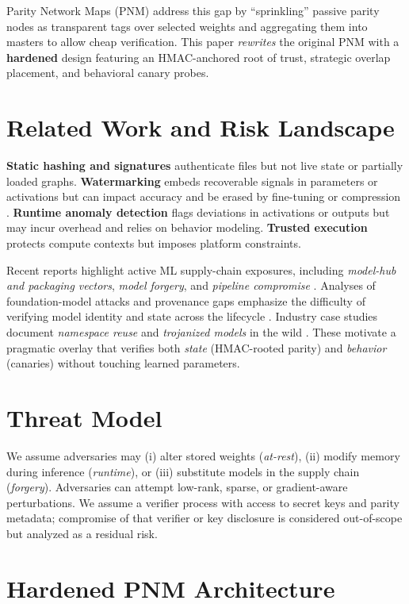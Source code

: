 \documentclass[11pt]{article}
\begin{document}
Parity Network Maps (PNM) address this gap by ``sprinkling'' passive parity nodes as transparent tags over selected weights and aggregating them into masters to allow cheap verification. This paper \emph{rewrites} the original PNM with a \textbf{hardened} design featuring an HMAC-anchored root of trust, strategic overlap placement, and behavioral canary probes.

\section{Related Work and Risk Landscape}
\textbf{Static hashing and signatures} authenticate files but not live state or partially loaded graphs. \textbf{Watermarking} embeds recoverable signals in parameters or activations but can impact accuracy and be erased by fine-tuning or compression \cite{adi2023-watermark-hard}. \textbf{Runtime anomaly detection} flags deviations in activations or outputs but may incur overhead and relies on behavior modeling. \textbf{Trusted execution} protects compute contexts but imposes platform constraints.  

\smallskip
Recent reports highlight active ML supply-chain exposures, including \emph{model-hub and packaging vectors}, \emph{model forgery}, and \emph{pipeline compromise} \cite{owasp-ml06-2023, mitre-atlas-2024, nist-ai-rmf-2023}. Analyses of foundation-model attacks and provenance gaps emphasize the difficulty of verifying model identity and state across the lifecycle \cite{carlini2024-foundation-prov, meiklejohn2025-ml-supply}. Industry case studies document \emph{namespace reuse} and \emph{trojanized models} in the wild \cite{unit42-2025-namespace-reuse}. These motivate a pragmatic overlay that verifies both \emph{state} (HMAC-rooted parity) and \emph{behavior} (canaries) without touching learned parameters.

\section{Threat Model}
We assume adversaries may (i) alter stored weights (\emph{at-rest}), (ii) modify memory during inference (\emph{runtime}), or (iii) substitute models in the supply chain (\emph{forgery}). Adversaries can attempt low-rank, sparse, or gradient-aware perturbations. We assume a verifier process with access to secret keys and parity metadata; compromise of that verifier or key disclosure is considered out-of-scope but analyzed as a residual risk.

\section{Hardened PNM Architecture}
\end{document}
